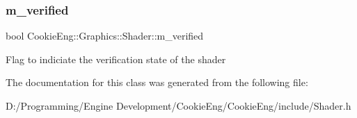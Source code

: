 \subsubsection{\texorpdfstring{m\+\_\+verified}{m\_verified}}
{\footnotesize\ttfamily bool Cookie\+Eng\+::\+Graphics\+::\+Shader\+::m\+\_\+verified\hspace{0.3cm}{\ttfamily [protected]}}

Flag to indiciate the verification state of the shader 

The documentation for this class was generated from the following file\+:\begin{DoxyCompactItemize}
\item 
D\+:/\+Programming/\+Engine Development/\+Cookie\+Eng/\+Cookie\+Eng/include/Shader.\+h\end{DoxyCompactItemize}
